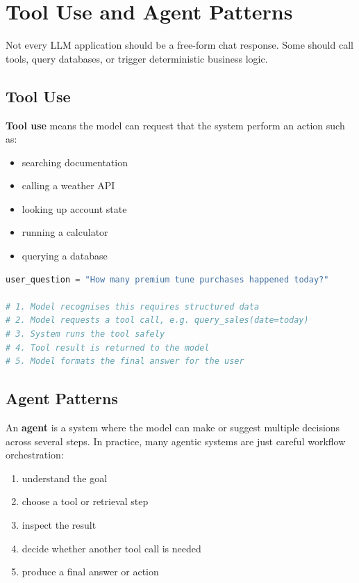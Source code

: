 \documentclass[12pt, a4paper, oneside]{book}
\begin{document}
\section{Tool Use and Agent Patterns}

Not every LLM application should be a free-form chat response. Some should call tools, query databases, or trigger deterministic business logic.

\subsection{Tool Use}
\textbf{Tool use} means the model can request that the system perform an action such as:
\begin{itemize}[leftmargin=2em]
    \item searching documentation
    \item calling a weather API
    \item looking up account state
    \item running a calculator
    \item querying a database
\end{itemize}

\begin{lstlisting}[language=Python, caption={Conceptual tool-call flow}]
user_question = "How many premium tune purchases happened today?"

# 1. Model recognises this requires structured data
# 2. Model requests a tool call, e.g. query_sales(date=today)
# 3. System runs the tool safely
# 4. Tool result is returned to the model
# 5. Model formats the final answer for the user
\end{lstlisting}

\subsection{Agent Patterns}
An \textbf{agent} is a system where the model can make or suggest multiple decisions across several steps. In practice, many agentic systems are just careful workflow orchestration:
\begin{enumerate}[leftmargin=2em]
    \item understand the goal
    \item choose a tool or retrieval step
    \item inspect the result
    \item decide whether another tool call is needed
    \item produce a final answer or action
\end{enumerate}
\end{document}
